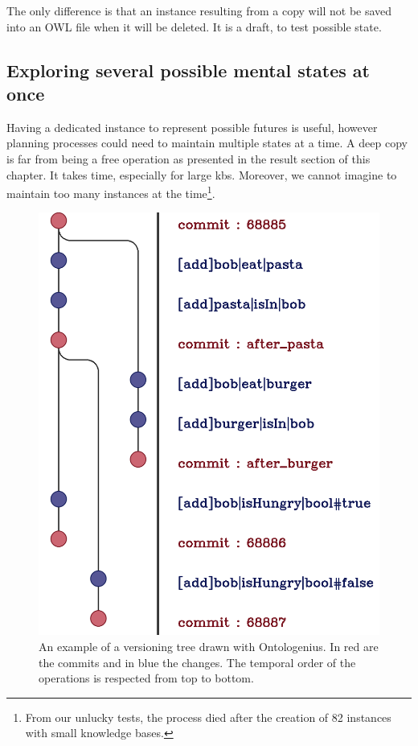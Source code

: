 The only difference is that an instance resulting from a copy will not be saved into an OWL file when it will be deleted. It is a draft, to test possible state.

\subsection{Exploring several possible mental states at once}

Having a dedicated instance to represent possible futures is useful, however planning processes could need to maintain multiple states at a time. A deep copy is far from being a free operation as presented in the result section of this chapter. It takes time, especially for large \acrshort{kb}s. Moreover, we cannot imagine to maintain too many instances at the time\footnote{From our unlucky tests, the process died after the creation of 82 instances with small knowledge bases.}.

\begin{figure}[ht!]
\centering
\includegraphics[scale=0.22]{figures/chapter2/commit.png}
\caption{\label{fig:chap2_commit} An example of a versioning tree drawn with Ontologenius. In red are the commits and in blue the changes. The temporal order of the operations is respected from top to bottom. }
\end{figure}

